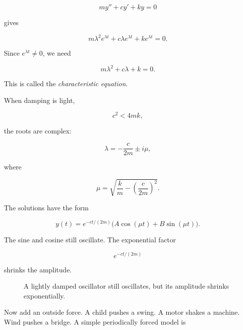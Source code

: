 \[
my''+cy'+ky=0
\]

gives

\[
m\lambda^2e^{\lambda t}+c\lambda e^{\lambda t}+ke^{\lambda t}=0.
\]

Since \(e^{\lambda t}\neq0\), we need

\[
\boxed{
m\lambda^2+c\lambda+k=0.
}
\]

This is called the \emph{characteristic equation}.

When damping is light,

\[
c^2<4mk,
\]

the roots are complex:

\[
\lambda
=
-\frac{c}{2m}\pm i\mu,
\]

where

\[
\mu=\sqrt{\frac{k}{m}-\left(\frac{c}{2m}\right)^2}.
\]

The solutions have the form

\[
\boxed{
y(t)=e^{-ct/(2m)}
\bigl(A\cos(\mu t)+B\sin(\mu t)\bigr).
}
\]

The sine and cosine still oscillate.  The exponential factor

\[
e^{-ct/(2m)}
\]

shrinks the amplitude.

\begin{figure}[h]
\centering
{}
\caption{A lightly damped oscillator still oscillates, but its amplitude shrinks exponentially.}
\label{fig:chapter17-damped-oscillation}
\end{figure}

Now add an outside force.  A child pushes a swing.  A motor shakes a machine.  Wind
pushes a bridge.  A simple periodically forced model is

